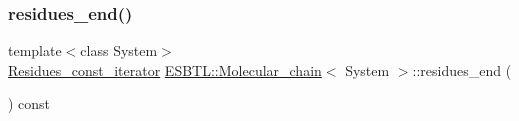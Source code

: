 \mbox{\label{group__grp__iters_ga074337267e031ed306dfa7048e3bb692}} 
\subsubsection{\texorpdfstring{residues\+\_\+end()}{residues\_end()}\hspace{0.1cm}{\footnotesize\ttfamily [4/4]}}
{\footnotesize\ttfamily template$<$class System$>$ \\
\hyperlink{group__grp__iters_ga4cadd9ac293bcd967a86f97bfc626a7f}{Residues\+\_\+const\+\_\+iterator} \hyperlink{classESBTL_1_1Molecular__chain}{E\+S\+B\+T\+L\+::\+Molecular\+\_\+chain}$<$ System $>$\+::residues\+\_\+end (\begin{DoxyParamCaption}{ }\end{DoxyParamCaption}) const\hspace{0.3cm}{\ttfamily [inline]}}

